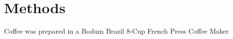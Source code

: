 \section{Methods}
\begin{outline}[enumerate]
\1 Coffee was prepared in a Bodum Brazil 8-Cup French Press Coffee Maker
\end{outline}
